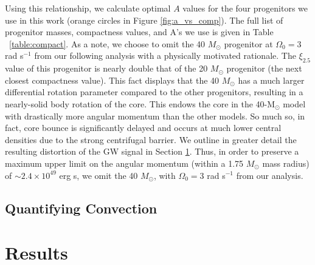 \documentclass[twocolumn,times]{aastex62}  %
\newcommand{\Msun}{\ensuremath{\mathrm{M}_\odot}\xspace}
\begin{document}
Using this relationship, we calculate optimal $A$ values for the four \citet{Suk:2016} progenitors we use in this work (orange circles in Figure \ref{fig:a_vs_comp}).  
The full list of progenitor masses, compactness values, and A's we use is given in Table ~\ref{table:compact}.  
As a note, we choose to omit the 40 $M_\odot$ progenitor at $\Omega_0 = 3$ rad s$^{-1}$ from our following analysis with a physically motivated rationale.  The $\xi_{2.5}$ value of this progenitor is nearly double that of the 20 $M_\odot$ progenitor (the next closest compactness value).  This fact displays that the 40 $M_\odot$ has a much larger differential rotation parameter compared to the other progenitors, resulting in a nearly-solid body rotation of the core. This endows the core in the 40-\Msun model with drastically more angular momentum than the other models.  
So much so, in fact, core bounce is significantly delayed and occurs at much lower central densities due to the strong centrifugal barrier.
We outline in greater detail the resulting distortion of the GW signal in Section \ref{sec:results}.  Thus, in order to preserve a maximum upper limit on the angular momentum (within a 1.75 $M_\odot$ mass radius) of $\sim 2.4\times 10^{49}$ erg s, we omit the 40 $M_\odot$, with $\Omega_0 = 3$ rad s$^{-1}$ from our analysis.  \\

\subsection{Quantifying Convection}



%


\section{Results}
\label{sec:results}
\end{document}
